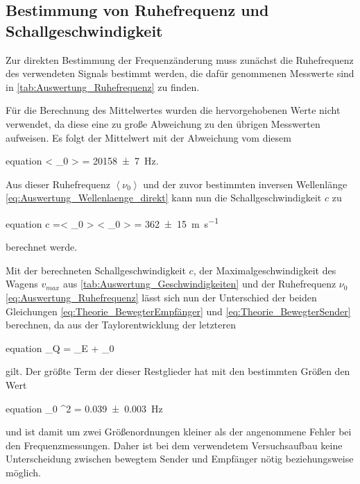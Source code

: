 	 
 	
 	
	
\subsection{Bestimmung von Ruhefrequenz und Schallgeschwindigkeit}
\label{sec:Auswertung_FrequenzSchall}
	Zur direkten Bestimmung der Frequenzänderung muss zunächst die Ruhefrequenz
	des verwendeten Signals bestimmt werden, die dafür genommenen Messwerte  
	sind in \cref{tab:Auswertung_Ruhefrequenz} zu finden.  
	
		
	
	Für die Berechnung des Mittelwertes wurden die hervorgehobenen Werte nicht verwendet,
	da diese eine zu große Abweichung zu den übrigen Messwerten aufweisen. Es folgt
	der Mittelwert mit der Abweichung vom diesem
	\begin{empheq}{equation}
		\label{eq:Auswertung_Ruhefrequenz}
		\left< \nu_{0} \right> = \SI{20158(7)}{\hertz}.
	\end{empheq} 
	
	Aus dieser Ruhefrequenz $\left< \nu_{0} \right>$ und der zuvor bestimmten inversen Wellenlänge 
	\cref{eq:Auswertung_Wellenlaenge_direkt} kann nun die Schallgeschwindigkeit $c$ zu
	\begin{empheq}{equation}
		\label{eq:Auswertung_Schallgeschwindigkeit}
		c =\left<  \lambda_{0} \right> \cdot \left< \nu_{0} \right> = \SI{362(15)}{\meter\per\second} \footnotemark
	\end{empheq}
	berechnet werde. 
	
	Mit der berechneten Schallgeschwindigkeit $c$, der Maximalgeschwindigkeit des Wagens 
	$v_{max}$ aus \cref{tab:Auswertung_Geschwindigkeiten} und der Ruhefrequenz $\nu_{0}$ 
	\cref{eq:Auswertung_Ruhefrequenz} lässt sich nun der Unterschied der beiden Gleichungen 
	\cref{eq:Theorie_BewegterEmpfänger} und \cref{eq:Theorie_BewegterSender} berechnen,
	da aus der Taylorentwicklung der letzteren 
	\begin{empheq}{equation}
		\nu_{Q} = \nu_{E} + \nu_{0} \cdot {}
	\end{empheq} 
	gilt.
	Der größte Term der dieser Restglieder hat mit den bestimmten Größen den Wert
		\begin{empheq}{equation}
		\nu_{0} \cdot {}^{2} = \SI{0.039(3)}{\hertz}
		\end{empheq} 
	und ist damit um zwei Größenordnungen kleiner als der angenommene Fehler bei den Frequenzmessungen.
	Daher ist bei dem verwendetem Versuchsaufbau keine Unterscheidung zwischen bewegtem Sender und 
	Empfänger nötig beziehungsweise möglich.     
		
